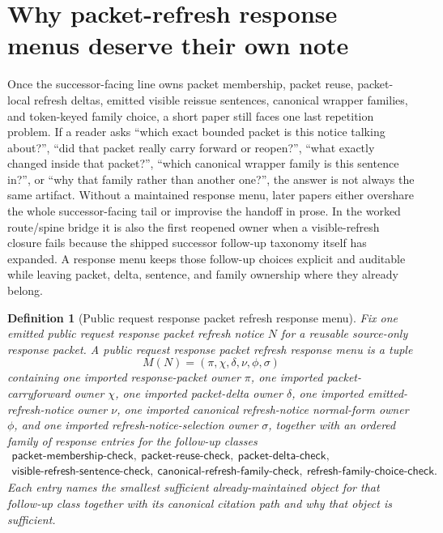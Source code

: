 \documentclass[11pt]{article}
\newtheorem{definition}{Definition}
\begin{document}
\section{Why packet-refresh response menus deserve their own note}
Once the successor-facing line owns packet membership, packet reuse, packet-local refresh deltas, emitted visible reissue sentences, canonical wrapper families, and token-keyed family choice, a short paper still faces one last repetition problem.
If a reader asks ``which exact bounded packet is this notice talking about?'', ``did that packet really carry forward or reopen?'', ``what exactly changed inside that packet?'', ``which canonical wrapper family is this sentence in?'', or ``why that family rather than another one?'', the answer is not always the same artifact.
Without a maintained response menu, later papers either overshare the whole successor-facing tail or improvise the handoff in prose. In the worked route/spine bridge it is also the first reopened owner when a visible-refresh closure fails because the shipped successor follow-up taxonomy itself has expanded.
A response menu keeps those follow-up choices explicit and auditable while leaving packet, delta, sentence, and family ownership where they already belong.

\begin{definition}[Public request response packet refresh response menu]
Fix one emitted public request response packet refresh notice $N$ for a reusable source-only response packet.
A \emph{public request response packet refresh response menu} is a tuple
\[
M(N)=(\pi,\chi,\delta,\nu,\phi,\sigma)
\]
containing one imported response-packet owner $\pi$, one imported packet-carryforward owner $\chi$, one imported packet-delta owner $\delta$, one imported emitted-refresh-notice owner $\nu$, one imported canonical refresh-notice normal-form owner $\phi$, and one imported refresh-notice-selection owner $\sigma$, together with an ordered family of response entries for the follow-up classes
\[
\begin{array}{l}
\textsf{packet-membership-check},\ \textsf{packet-reuse-check},\ \textsf{packet-delta-check},\\
\textsf{visible-refresh-sentence-check},\ \textsf{canonical-refresh-family-check},\ \textsf{refresh-family-choice-check}.
\end{array}
\]
Each entry names the smallest sufficient already-maintained object for that follow-up class together with its canonical citation path and why that object is sufficient.
\end{definition}
\end{document}
